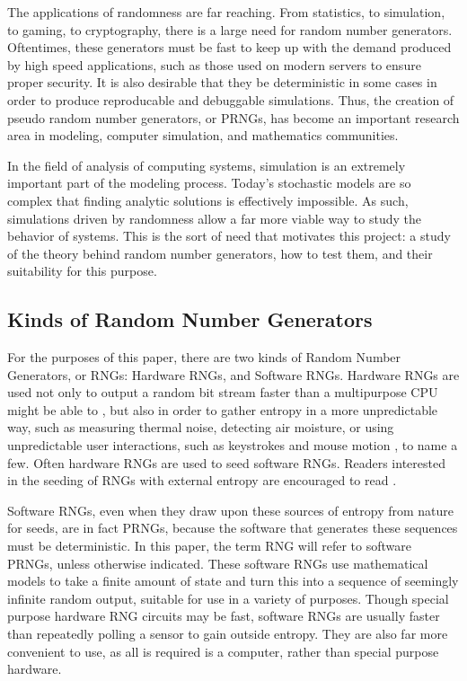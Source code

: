 The applications of randomness are far reaching. From statistics, to simulation, to gaming, to cryptography, there is a large need for random number generators. Oftentimes, these generators must be fast to keep up with the demand produced by high speed applications, such as those used on modern servers to ensure proper security. It is also desirable that they be deterministic in some cases in order to produce reproducable and debuggable simulations. Thus, the creation of pseudo random number generators, or PRNGs, has become an important research area in modeling, computer simulation, and mathematics communities.

In the field of analysis of computing systems, simulation is an extremely important part of the modeling process. Today's stochastic models are so complex that finding analytic solutions is effectively impossible. As such, simulations driven by randomness allow a far more viable way to study the behavior of systems. This is the sort of need that motivates this project: a study of the theory behind random number generators, how to test them, and their suitability for this purpose.

\subsection{Kinds of Random Number Generators}
For the purposes of this paper, there are two kinds of Random Number Generators, or RNGs: Hardware RNGs, and Software RNGs. Hardware RNGs are used not only to output a random bit stream faster than a multipurpose CPU might be able to \cite{Saiprasert:2010:OHA:1857927.1857929,Barel:1983:FHR:800042.801454}, but also in order to gather entropy in a more unpredictable way, such as measuring thermal noise, detecting air moisture, or using unpredictable user interactions, such as keystrokes and mouse motion , to name a few. Often hardware RNGs are used to seed software RNGs. Readers interested in the seeding of RNGs with external entropy are encouraged to read \cite{Hennebert:2013:EHP:2462096.2462122}.

Software RNGs, even when they draw upon these sources of entropy from nature for seeds, are in fact PRNGs, because the software that generates these sequences must be deterministic. In this paper, the term RNG will refer to software PRNGs, unless otherwise indicated. These software RNGs use mathematical models to take a finite amount of state and turn this into a sequence of seemingly infinite random output, suitable for use in a variety of purposes. Though special purpose hardware RNG circuits may be fast, software RNGs are usually faster than repeatedly polling a sensor to gain outside entropy. They are also far more convenient to use, as all is required is a computer, rather than special purpose hardware.

